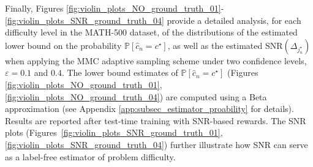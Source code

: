 Finally, Figures \ref{fig:violin_plots_NO_ground_truth_01}-\ref{fig:violin_plots_SNR_ground_truth_04} provide a detailed analysis, for each difficulty level in the MATH-500 dataset, of the distributions of the estimated lower bound on the probability $\mathbb{P}[\widehat{c}_n= c^\star]$, as well as the estimated ${\text{SNR}}(\Delta_{j^\star_n})$ when applying the MMC adaptive sampling scheme under two confidence levels, $\varepsilon = 0.1$ and $0.4$. 
The lower bound estimates of $\mathbb{P}[\widehat{c}_n = c^\star]$ (Figures \ref{fig:violin_plots_NO_ground_truth_01}, \ref{fig:violin_plots_NO_ground_truth_04}) are computed using a Beta approximation (see Appendix \ref{app:subsec_estimator_proability} for details).
Results are reported after test-time training with SNR-based rewards.
The SNR plots (Figures~\ref{fig:violin_plots_SNR_ground_truth_01}, \ref{fig:violin_plots_SNR_ground_truth_04}) further illustrate how SNR can serve as a label-free estimator of problem difficulty.


